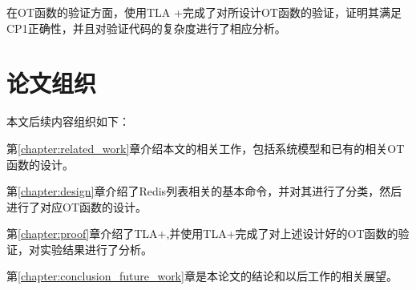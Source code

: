 	\par 在OT函数的验证方面，使用TLA +完成了对所设计OT函数的验证，证明其满足CP1正确性，并且对验证代码的复杂度进行了相应分析。
\section{论文组织}
	\par 本文后续内容组织如下：
	\par 第\ref{chapter:related_work}章介绍本文的相关工作，包括系统模型和已有的相关OT函数的设计。
	\par 第\ref{chapter:design}章介绍了Redis列表相关的基本命令，并对其进行了分类，然后进行了对应OT函数的设计。
	\par 第\ref{chapter:proof}章介绍了TLA+,并使用TLA+完成了对上述设计好的OT函数的验证，对实验结果进行了分析。
	\par 第\ref{chapter:conclusion_future_work}章是本论文的结论和以后工作的相关展望。